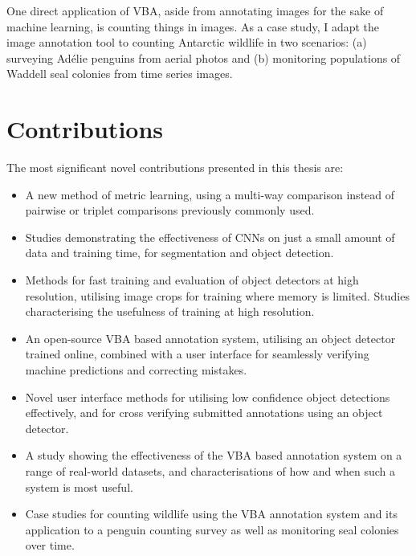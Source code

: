 One direct application of \gls{VBA}, aside from annotating images for the sake of machine learning, is counting things in images. As a case study, I adapt the image annotation tool to counting Antarctic wildlife in two scenarios: (a) surveying Ad\'elie penguins from aerial photos and (b) monitoring populations of Waddell seal colonies from time series images.

\section {Contributions}
\label{sec: contributions}

The most significant novel contributions presented in this thesis are:

\begin{itemize}

    \item A new method of metric learning, using a multi-way comparison instead of pairwise or triplet comparisons previously commonly used.
    
    \item Studies demonstrating the effectiveness of \gls{CNN}s on just a small amount of data and training time, for segmentation and object detection.
    
    \item Methods for fast training and evaluation of object detectors at high resolution, utilising image crops for training where memory is limited. Studies characterising the usefulness of training at high resolution.    
    
    \item An open-source \gls{VBA} based annotation system, utilising an object detector trained online, combined with a user interface for seamlessly verifying machine predictions and correcting mistakes.

    \item Novel user interface methods for utilising low confidence object detections effectively, and for cross verifying submitted annotations using an object detector.
    
    \item A study showing the effectiveness of the \gls{VBA} based annotation system on a range of real-world datasets, and characterisations of how and when such a system is most useful.
    
    \item Case studies for counting wildlife using the \gls{VBA} annotation system and its application to a penguin counting survey as well as monitoring seal colonies over time. 
    
\end{itemize}

